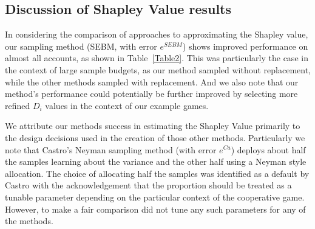 
\subsection{Discussion of Shapley Value results}\label{subsection:discussion_shapley}

In considering the comparison of approaches to approximating the Shapley value, our sampling method (SEBM, with error $e^{SEBM}$) shows improved performance on almost all accounts, as shown in Table~\ref{Table2}.
This was particularly the case in the context of large sample budgets, as our method sampled without replacement, while the other methods sampled with replacement.
And we also note that our method's performance could potentially be further improved by selecting more refined $D_i$ values in the context of our example games.

We attribute our methods success in estimating the Shapley Value primarily to the design decisions used in the creation of those other methods.
Particularly we note that Castro's Neyman sampling method (with error $e^{Ca}$) deploys about half the samples learning about the variance and the other half using a Neyman style allocation.
The choice of allocating half the samples was identified as a default by Castro with the acknowledgement that the proportion should be treated as a tunable parameter depending on the particular context of the cooperative game.
However, to make a fair comparison did not tune any such parameters for any of the methods.

